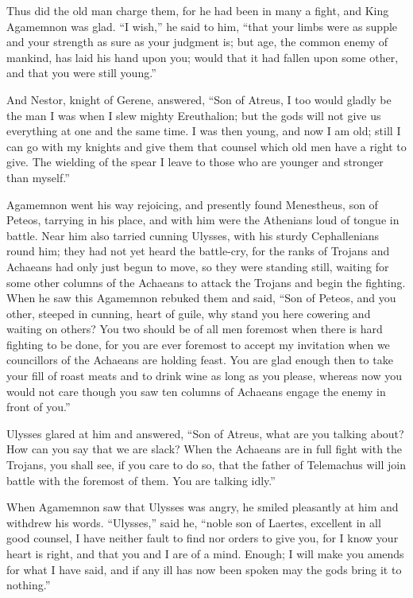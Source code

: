 Thus did the old man charge them, for he had been in many a fight, and
King Agamemnon was glad. “I wish,” he said to him, “that your limbs were
as supple and your strength as sure as your judgment is; but age, the
common enemy of mankind, has laid his hand upon you; would that it had
fallen upon some other, and that you were still young.”

And Nestor, knight of Gerene, answered, “Son of Atreus, I too would gladly
be the man I was when I slew mighty Ereuthalion; but the gods will not
give us everything at one and the same time. I was then young, and now I
am old; still I can go with my knights and give them that counsel which
old men have a right to give. The wielding of the spear I leave to those
who are younger and stronger than myself.”

Agamemnon went his way rejoicing, and presently found Menestheus, son of
Peteos, tarrying in his place, and with him were the Athenians loud of
tongue in battle. Near him also tarried cunning Ulysses, with his sturdy
Cephallenians round him; they had not yet heard the battle-cry, for the
ranks of Trojans and Achaeans had only just begun to move, so they were
standing still, waiting for some other columns of the Achaeans to attack
the Trojans and begin the fighting. When he saw this Agamemnon rebuked
them and said, “Son of Peteos, and you other, steeped in cunning, heart of
guile, why stand you here cowering and waiting on others? You two should
be of all men foremost when there is hard fighting to be done, for you are
ever foremost to accept my invitation when we councillors of the Achaeans
are holding feast. You are glad enough then to take your fill of roast
meats and to drink wine as long as you please, whereas now you would not
care though you saw ten columns of Achaeans engage the enemy in front of
you.”

Ulysses glared at him and answered, “Son of Atreus, what are you talking
about? How can you say that we are slack? When the Achaeans are in full
fight with the Trojans, you shall see, if you care to do so, that the
father of Telemachus will join battle with the foremost of them. You are
talking idly.”

When Agamemnon saw that Ulysses was angry, he smiled pleasantly at him and
withdrew his words. “Ulysses,” said he, “noble son of Laertes, excellent
in all good counsel, I have neither fault to find nor orders to give you,
for I know your heart is right, and that you and I are of a mind. Enough;
I will make you amends for what I have said, and if any ill has now been
spoken may the gods bring it to nothing.”

